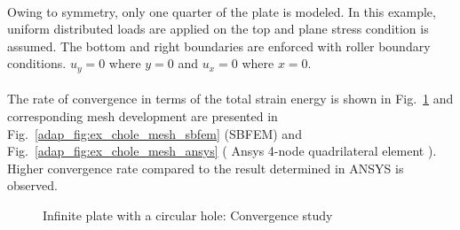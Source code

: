 \paragraph{}
Owing to symmetry, only one quarter of the plate is modeled.
In this example, uniform distributed loads are applied on the top and plane stress condition is assumed.
The bottom and right boundaries are enforced with roller boundary conditions.
$u_y=0$ where $y=0$ and $u_x=0$ where $x=0$.

\paragraph{}
The rate of convergence in terms of the total strain energy is shown in Fig.~\ref{adap_fig:ex_chole_conv} and corresponding mesh development are presented in Fig.~\ref{adap_fig:ex_chole_mesh_sbfem} (SBFEM) and Fig.~\ref{adap_fig:ex_chole_mesh_ansys} ( Ansys 4-node quadrilateral element ).
Higher convergence rate compared to the result determined in ANSYS is observed.
\begin{figure}[h!]
    \centering
    \caption{Infinite plate with a circular hole: Convergence study}
    \label{adap_fig:ex_chole_conv}
\end{figure}

